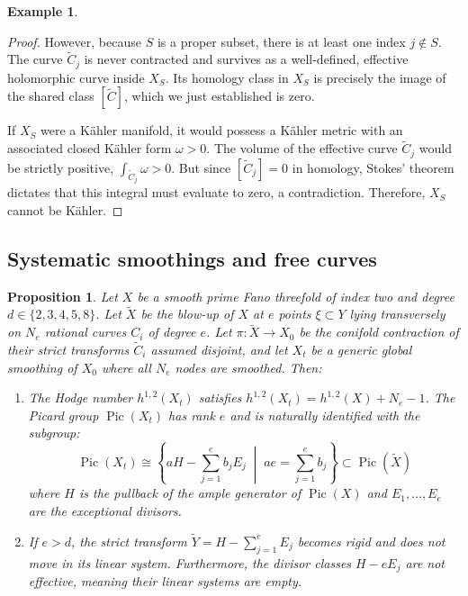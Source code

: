 \documentclass[11pt]{article}
\newtheorem{prop}[thm]{Proposition}
\theoremstyle{definition}
\newtheorem{ex}[thm]{Example}
\DeclareMathOperator{\Pic}{Pic}
\begin{document}
\begin{ex}
\begin{proof}
However, because $S$ is a proper subset, there is at least one index $j \notin S$. The curve $\tilde{C}_j$ is never contracted and survives as a well-defined, effective holomorphic curve inside $X_S$. Its homology class in $X_S$ is precisely the image of the shared class $[\tilde{C}]$, which we just established is zero. 

If $X_S$ were a Kähler manifold, it would possess a Kähler metric with an associated closed Kähler form $\omega > 0$. The volume of the effective curve $\tilde{C}_j$ would be strictly positive, $\int_{\tilde{C}_j} \omega > 0$. But since $[\tilde{C}_j] = 0$ in homology, Stokes' theorem dictates that this integral must evaluate to zero, a contradiction. Therefore, $X_S$ cannot be Kähler.
\end{proof}
\end{ex}

\subsection{Systematic smoothings and free curves}
\begin{prop}
Let $X$ be a smooth prime Fano threefold of index two and degree $d \in \{2,3,4,5,8\}$. Let $\tilde{X}$ be the blow-up of $X$ at $e$ points $\xi \subset Y$ lying transversely on $N_e$ rational curves $C_i$ of degree $e$. Let $\pi \colon \tilde{X} \to X_0$ be the conifold contraction of their strict transforms $\tilde{C}_i$ \emph{assumed disjoint}, and let $X_t$ be a generic global smoothing of $X_0$ where all $N_e$ nodes are smoothed. Then:
\begin{enumerate}
    \item The Hodge number $h^{1,2}(X_t)$ satisfies $h^{1,2}(X_t) = h^{1,2}(X) + N_e - 1$. The Picard group $\Pic(X_t)$ has rank $e$ and is naturally identified with the subgroup:
    \[
    \Pic(X_t) \cong \left\{ aH - \sum_{j=1}^{e} b_j E_j \;\middle|\; ae = \sum_{j=1}^{e} b_j \right\} \subset \Pic(\tilde{X})
    \]
    where $H$ is the pullback of the ample generator of $\Pic(X)$ and $E_1, \dots, E_e$ are the exceptional divisors.
    
\item If $e > d$, the strict transform $\tilde{Y} = H - \sum_{j=1}^{e} E_j$ becomes rigid and does not move in its linear system. Furthermore, the divisor classes $H - eE_j$ are not effective, meaning their linear systems are empty.    
\end{enumerate}
\end{prop}
\end{document}
